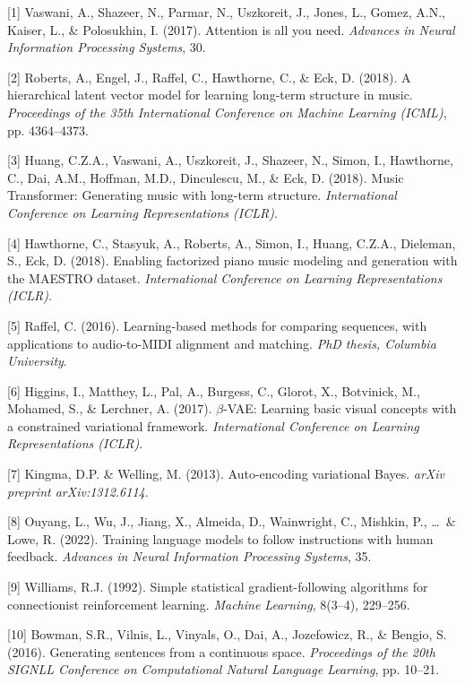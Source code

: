 \documentclass{article}
\begin{document}
{\small

[1] Vaswani, A., Shazeer, N., Parmar, N., Uszkoreit, J., Jones, L., Gomez, A.N., Kaiser, L., \& Polosukhin, I. (2017). Attention is all you need. \textit{Advances in Neural Information Processing Systems}, 30.

[2] Roberts, A., Engel, J., Raffel, C., Hawthorne, C., \& Eck, D. (2018). A hierarchical latent vector model for learning long-term structure in music. \textit{Proceedings of the 35th International Conference on Machine Learning (ICML)}, pp. 4364--4373.

[3] Huang, C.Z.A., Vaswani, A., Uszkoreit, J., Shazeer, N., Simon, I., Hawthorne, C., Dai, A.M., Hoffman, M.D., Dinculescu, M., \& Eck, D. (2018). Music Transformer: Generating music with long-term structure. \textit{International Conference on Learning Representations (ICLR)}.

[4] Hawthorne, C., Stasyuk, A., Roberts, A., Simon, I., Huang, C.Z.A., Dieleman, S., Eck, D. (2018). Enabling factorized piano music modeling and generation with the MAESTRO dataset. \textit{International Conference on Learning Representations (ICLR)}.

[5] Raffel, C. (2016). Learning-based methods for comparing sequences, with applications to audio-to-MIDI alignment and matching. \textit{PhD thesis, Columbia University}.

[6] Higgins, I., Matthey, L., Pal, A., Burgess, C., Glorot, X., Botvinick, M., Mohamed, S., \& Lerchner, A. (2017). $\beta$-VAE: Learning basic visual concepts with a constrained variational framework. \textit{International Conference on Learning Representations (ICLR)}.

[7] Kingma, D.P. \& Welling, M. (2013). Auto-encoding variational Bayes. \textit{arXiv preprint arXiv:1312.6114}.

[8] Ouyang, L., Wu, J., Jiang, X., Almeida, D., Wainwright, C., Mishkin, P., \ldots\ \& Lowe, R. (2022). Training language models to follow instructions with human feedback. \textit{Advances in Neural Information Processing Systems}, 35.

[9] Williams, R.J. (1992). Simple statistical gradient-following algorithms for connectionist reinforcement learning. \textit{Machine Learning}, 8(3--4), 229--256.

[10] Bowman, S.R., Vilnis, L., Vinyals, O., Dai, A., Jozefowicz, R., \& Bengio, S. (2016). Generating sentences from a continuous space. \textit{Proceedings of the 20th SIGNLL Conference on Computational Natural Language Learning}, pp. 10--21.

}
\end{document}

